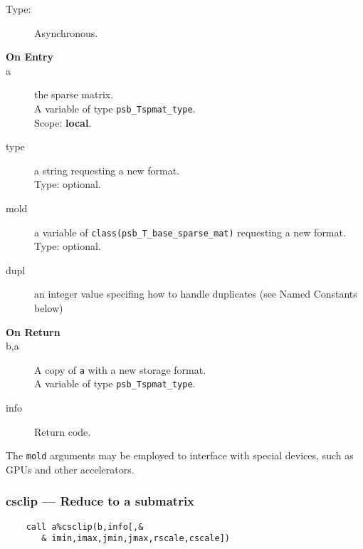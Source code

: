 \begin{description}
\item[Type:] Asynchronous.
\item[\bf On Entry]
\item[a] the sparse matrix.\\
A variable of type \verb|psb_Tspmat_type|.\\
Scope: {\bf local}.\\
\item[type] a string requesting a new format.\\
Type: optional.
\item[mold] a variable of \verb|class(psb_T_base_sparse_mat)|  requesting a new format.\\
Type: optional.
\item[dupl] an integer value specifing how to handle duplicates (see
  Named Constants below)
\end{description}

\begin{description}
\item[\bf On Return]
\item[b,a] A copy  of \verb|a| with a new storage format.\\
A variable of type \verb|psb_Tspmat_type|.
\item[info] Return code. 
\end{description}
The \verb|mold|  arguments may be
employed to interface with special devices, such as GPUs and other
accelerators. 


\subsubsection{csclip --- Reduce to a submatrix}
\begin{verbatim}
    call a%csclip(b,info[,&
       & imin,imax,jmin,jmax,rscale,cscale])
\end{verbatim}

